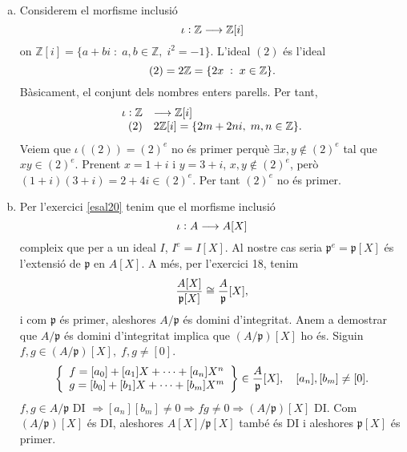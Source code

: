 \documentclass[../main.tex]{subfiles}
\begin{document}
\begin{sol}
\begin{enumerate}[(a)]
    
    \item Considerem el morfisme inclusió
    \begin{equation}
        \notag
        \iota:\mathbb{Z}\longrightarrow\mathbb{Z}[i]
    \end{equation}
    on $\mathbb{Z}[i] = \{a+bi\;:\;a,b\in\mathbb{Z},\;i^2=-1\}$. L'ideal $(2)$ és l'ideal
    \begin{equation}
        \notag
        (2) = 2\mathbb{Z} = \{2x\;:\;x\in\mathbb{Z}\}.
    \end{equation}
    Bàsicament, el conjunt dels nombres enters parells. Per tant,
    \begin{equation}
        \notag
        \begin{array}{rl}
            \iota:\mathbb{Z} & \longrightarrow\mathbb{Z}[i] \\
            (2) & 2\mathbb{Z}[i] = \{2m+2ni,\;m,n\in\mathbb{Z}\}.
        \end{array}
    \end{equation}
    Veiem que $\iota((2)) = (2)^{e}$ no és primer perquè $\exists x,y\not\in (2)^{e}$ tal que $xy\in (2)^{e}$. Prenent $x = 1+i$ i $y=3+i$, $x,y\not\in (2)^{e}$, però $(1+i)(3+i) = 2+4i\in (2)^{e}$. Per tant $(2)^{e}$ no és primer.
    
    
    
    
    \item Per l'exercici \ref{esal20} tenim que el morfisme inclusió 
    \begin{equation}
        \notag
        \iota:A\longrightarrow A[X]
    \end{equation}
    compleix que per a un ideal $I$, $I^{e} = I[X]$. Al nostre cas seria $\mathfrak{p}^{e} = \mathfrak{p}[X]$ és l'extensió de $\mathfrak{p}$ en $A[X]$. A més, per l'exercici 18, tenim
    \begin{equation}
        \notag
        \frac{A[X]}{\mathfrak{p}[X]}\cong \frac{A}{\mathfrak{p}}[X],
    \end{equation}
    i com $\mathfrak{p}$ és primer, aleshores $A/\mathfrak{p}$ és domini d'integritat. Anem a demostrar que $A/\mathfrak{p}$ és domini d'integritat implica que $(A/\mathfrak{p})[X]$ ho és. Siguin $f,g\in (A/\mathfrak{p})[X],\;f,g\not=[0]$. 
    \begin{equation}
        \notag
        \left\{
        \begin{array}{ll}
            f = [a_0]+[a_1]X+\cdots+[a_n]X^n \\
            g = [b_0]+[b_1]X+\cdots+[b_m]X^m
        \end{array}
        \right\}\in \frac{A}{\mathfrak{p}}[X],\quad [a_n],[b_m]\not=[0].
    \end{equation}
    $f,g\in A/\mathfrak{p}$ DI $\Rightarrow [a_n][b_m]\not=0\Rightarrow fg\not=0\Rightarrow (A/\mathfrak{p})[X]$ DI. Com $(A/\mathfrak{p})[X]$ és DI, aleshores $A[X]/\mathfrak{p}[X]$ també és DI i aleshores $\mathfrak{p}[X]$ és primer.
\end{enumerate}
\end{sol}
\end{document}
